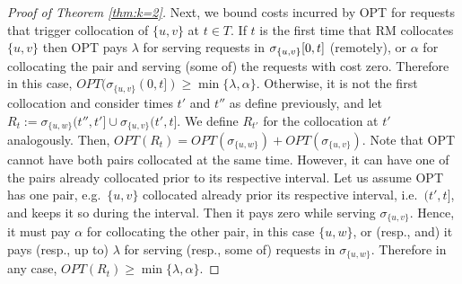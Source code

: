 \documentclass[manuscript,screen=true, review, anonymous]{acmart}
\newcommand{\OPT}{\textsf{OPT}\xspace}
\newcommand{\OPTM}{\mathit{OPT}}
\newcommand{\RM}{\textsf{RM}\xspace} %
\DeclarePairedDelimiter\set{\{}{\}}
\newcommand\mahmoud[1]{\color{orange}\textbf{Mahmoud: #1~}\color{black}}
\begin{document}
\begin{proof}[Proof of Theorem \ref{thm:k=2}]
	Next,
	we bound  costs incurred by \OPT for requests that trigger collocation of $\{u,v\}$ at $t \in T$.
	If $t$ is the first time that \RM collocates $\{u,v\}$ then  \OPT pays
	$\lambda$ for serving requests in $\sigma_{\set{u,v}}[0,t]$ (remotely),
	or $\alpha$ for collocating the pair and
	serving (some of) the requests with  cost zero.
	Therefore in this case,
	$\OPTM (\sigma_{\{u,v\}}(0,t]) \geq  \min{\{ \lambda,\alpha \}}$.
	Otherwise,
	it is not the first collocation and
	consider times $t'$ and $t''$ as define previously,
	 and let 
	$R_t := \sigma_{\{u,w\}}(t'',t'] \cup \sigma_{\{u,v\}}(t',t] $.
	We define $R_{t'}$ for the collocation at $t'$  analogously.
	Then,
	$\OPTM(R_t) = \mathit{OPT} (\sigma_{\{u,w\}}) 
	+ \OPTM(\sigma_{\{u,v\}}) $.
	Note that \OPT cannot have both pairs collocated at the same time.
	However, it can have one of the pairs already collocated prior to its respective interval.
	Let us assume  \OPT has one pair,
	e.g.~$\{u,v\}$ collocated already prior its respective interval, i.e.~$(t',t]$,
	 and keeps it so during the interval.
	 Then it pays zero while serving $\sigma_{\{u,v\}}$.
	Hence,
	it must pay $\alpha$ for collocating the other pair, in this case $\{u,w\}$,
	or (resp., and) it pays (resp., up to) $\lambda$ for serving (resp., some of) requests in $\sigma_{\{u,w\}}$. 
	Therefore in any case,
	$\OPTM(R_t) \geq  \min{\{ \lambda,\alpha \}}$.

	

\end{proof}
\end{document}
